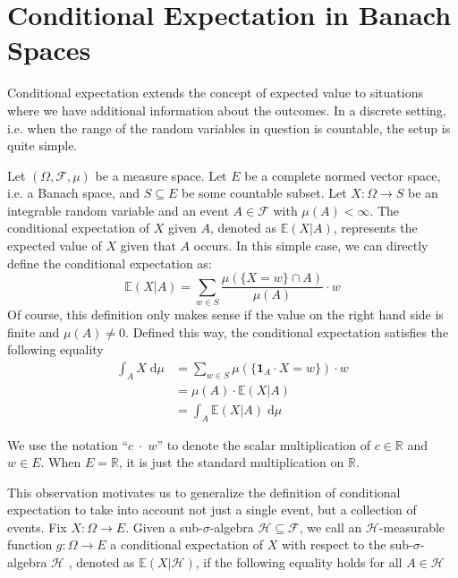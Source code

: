 ﻿%

\chapter{Conditional Expectation in Banach Spaces}\label{chapter:conditional_expectation}

Conditional expectation extends the concept of expected value to situations where we have additional information about the outcomes. In a discrete setting, i.e. when the range of the random variables in question is countable, the setup is quite simple. 
\par Let $(\Omega, \mathcal{F}, \mu)$ be a measure space. Let $E$ be a complete normed vector space, i.e. a Banach space, and $S \subseteq E$ be some countable subset. Let $X : \Omega \rightarrow S$ be an integrable random variable and an event $A \in \mathcal{F}$ with $\mu(A) < \infty$. The conditional expectation of $X$ given $A$, denoted as $\mathbb{E}(X \vert A)$, represents the expected value of $X$ given that $A$ occurs. In this simple case, we can directly define the conditional expectation as:
\[
	\mathbb{E}(X \vert A) = \sum_{w \in S} \frac{\mu(\{X = w\} \cap A)}{\mu(A)} \cdot w
\]
Of course, this definition only makes sense if the value on the right hand side is finite and $\mu(A) \neq 0$. Defined this way, the conditional expectation satisfies the following equality
\begin{align*}
	\int_A X \; \textrm{d} \mu &= \sum_{w \in S} \mu(\{\mathbf{1}_A \cdot X = w\}) \cdot w\\
	&= \mu(A) \cdot \mathbb{E}(X \vert A) \\
	&= \int_A \mathbb{E}(X \vert A) \; \textrm{d} \mu
\end{align*}

\begin{remark}
	We use the notation ``$c \; \cdot \; w$'' to denote the scalar multiplication of $c \in \mathbb{R}$ and $w \in E$. When $E = \mathbb{R}$, it is just the standard multiplication on $\mathbb{R}$. 
\end{remark}

This observation motivates us to generalize the definition of conditional expectation to take into account not just a single event, but a collection of events. Fix $X : \Omega \rightarrow E$. Given a sub-$\sigma$-algebra $\mathcal{H} \subseteq \mathcal{F}$, we call an $\mathcal{H}$-measurable function $g : \Omega \rightarrow E$ a conditional expectation of $X$ with respect to the sub-$\sigma$-algebra $\mathcal{H}$ , denoted as $\mathbb{E}(X \vert \mathcal{H})$, if the following equality holds for all $A \in \mathcal{H}$


